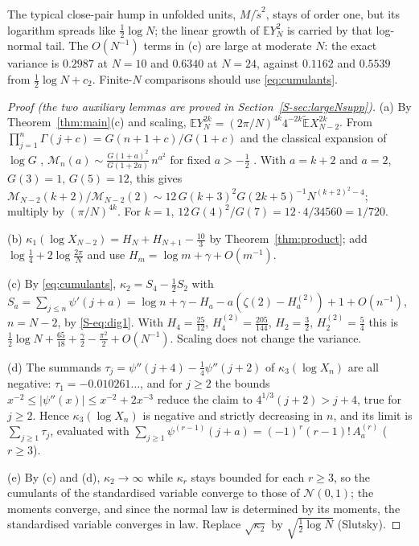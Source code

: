 \documentclass[12pt]{amsart}
\theoremstyle{remark}
\newcommand{\E}{\mathbb{E}}
\newcommand{\Et}{\widetilde{\mathbb{E}}}
\newcommand{\1}{\mathbf{1}}
\begin{document}
The typical close-pair hump in unfolded units, $M/\tilde s^2$, stays of
order one, but its logarithm spreads like $\frac12\log N$; the linear growth
of $\E Y_N^2$ is carried by that log-normal tail. The $O(N^{-1})$ terms in
(c) are large at moderate $N$: the exact variance is $0.2987$ at $N=10$ and
$0.6340$ at $N=24$, against $0.1162$ and $0.5539$ from $\frac12\log N+c_2$.
Finite-$N$ comparisons should use \eqref{eq:cumulants}.

\begin{proof}[Proof (the two auxiliary lemmas are proved in
Section~\ref{S-sec:largeNsupp})]
(a) By Theorem~\ref{thm:main}(c) and scaling,
$\E Y_N^{2k}=(2\pi/N)^{4k}4^{-2k}\Et X_{N-2}^{2k}$. From
$\prod_{j=1}^n\Gamma(j+c)=G(n+1+c)/G(1+c)$ and the classical expansion of
$\log G$ \cite{Bar00},
$\mathcal M_n(a)\sim\frac{G(1+a)^2}{G(1+2a)}\,n^{a^2}$ for fixed
$a>-\frac12$ \cite{KS00}. With $a=k+2$ and $a=2$, $G(3)=1$, $G(5)=12$, this
gives $\mathcal M_{N-2}(k+2)/\mathcal M_{N-2}(2)\sim12\,G(k+3)^2G(2k+5)^{-1}
N^{(k+2)^2-4}$; multiply by $(\pi/N)^{4k}$. For $k=1$,
$12\,G(4)^2/G(7)=12\cdot4/34560=1/720$.

(b) $\kappa_1(\log X_{N-2})=H_N+H_{N+1}-\frac{10}3$ by
Theorem~\ref{thm:product}; add $\log\frac14+2\log\frac{2\pi}N$ and use
$H_m=\log m+\gamma+O(m^{-1})$.

(c) By \eqref{eq:cumulants}, $\kappa_2=S_4-\frac12S_2$ with
$S_a=\sum_{j\le n}\psi'(j+a)=\log n+\gamma-H_a-a(\zeta(2)-H_a^{(2)})+1+O(n^{-1})$,
$n=N-2$, by \eqref{S-eq:dig1}. With $H_4=\frac{25}{12}$, $H_4^{(2)}=\frac{205}{144}$,
$H_2=\frac32$, $H_2^{(2)}=\frac54$ this is
$\frac12\log N+\frac{65}{18}+\frac\gamma2-\frac{\pi^2}2+O(N^{-1})$.
Scaling does not change the variance.

(d) The summands $\tau_j=\psi''(j+4)-\frac14\psi''(j+2)$ of
$\kappa_3(\log X_n)$ are all negative: $\tau_1=-0.010261\ldots$, and for
$j\ge2$ the bounds $x^{-2}\le|\psi''(x)|\le x^{-2}+2x^{-3}$ reduce the
claim to $4^{1/3}(j+2)>j+4$, true for $j\ge2$. Hence $\kappa_3(\log X_n)$ is negative and
strictly decreasing in $n$, and its limit is $\sum_{j\ge1}\tau_j$, evaluated
with $\sum_{j\ge1}\psi^{(r-1)}(j+a)=(-1)^r(r-1)!\,A_a^{(r)}$ ($r\ge3$).

(e) By (c) and (d), $\kappa_2\to\infty$ while $\kappa_r$ stays bounded for
each $r\ge3$, so the cumulants of the standardised variable converge to
those of $\mathcal N(0,1)$; the moments converge, and since the normal law
is determined by its moments, the standardised variable converges in law.
Replace
$\sqrt{\kappa_2}$ by $\sqrt{\frac12\log N}$ (Slutsky).
\end{proof}
\end{document}
